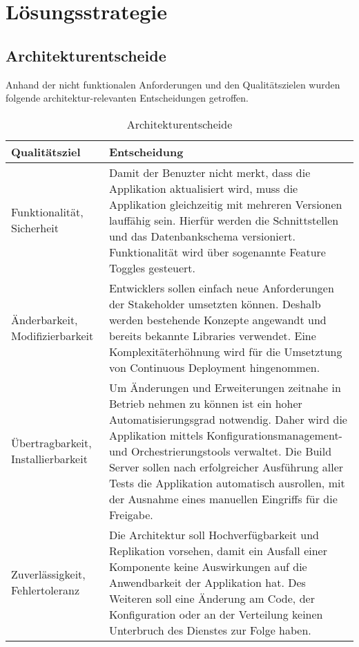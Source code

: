 \chapter{Lösungsstrategie}

\section{Architekturentscheide}

Anhand der nicht funktionalen Anforderungen und den Qualitätszielen wurden folgende architektur-relevanten Entscheidungen getroffen.

\begin{table}[H]
	\centering
	\caption{Architekturentscheide}
	\begin{tabular}{ | p{4cm} | p{12cm} | }
		\toprule
		{\textbf{Qualitätsziel}} & {\textbf{Entscheidung}} \\
		\midrule
		Funktionalität, Sicherheit &  Damit der Benuzter nicht merkt, dass die Applikation aktualisiert wird, muss die Applikation gleichzeitig mit mehreren Versionen lauffähig sein. Hierfür werden die Schnittstellen und das Datenbankschema versioniert. Funktionalität wird über sogenannte Feature Toggles gesteuert.\\ \hline
		Änderbarkeit, Modifizierbarkeit & Entwicklers sollen einfach neue Anforderungen der Stakeholder umsetzten können. Deshalb werden bestehende Konzepte angewandt und bereits bekannte Libraries verwendet. Eine Komplexitäterhöhnung wird für die Umsetztung von Continuous Deployment hingenommen. \\ \hline
		Übertragbarkeit, Installierbarkeit &  Um Änderungen und Erweiterungen zeitnahe in Betrieb nehmen zu können ist ein hoher Automatisierungsgrad notwendig. Daher wird die Applikation mittels Konfigurationsmanagement- und Orchestrierungstools verwaltet. Die Build Server sollen nach erfolgreicher Ausführung aller Tests die Applikation automatisch ausrollen, mit der Ausnahme eines manuellen Eingriffs für die Freigabe.\\ \hline
		Zuverlässigkeit, Fehlertoleranz &  Die Architektur soll Hochverfügbarkeit und Replikation vorsehen, damit ein Ausfall einer Komponente keine Auswirkungen auf die Anwendbarkeit der Applikation hat. Des Weiteren soll eine Änderung am Code, der Konfiguration oder an der Verteilung keinen Unterbruch des Dienstes zur Folge haben.\\
		\bottomrule
	\end{tabular}
\end{table}

